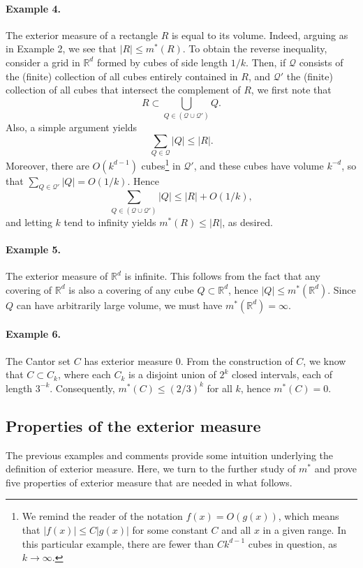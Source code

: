 \documentclass[11pt,openany]{book}
\begin{document}
\paragraph{Example 4.} The exterior measure of a rectangle $R$ is equal to its volume. Indeed, arguing as in Example 2, we see that $|R|\le m^*(R)$. To obtain the reverse inequality, consider a grid in $\mathbb{R}^d$ formed by cubes of side length $1/k$. Then, if $\mathcal Q$ consists of the (finite) collection of all cubes entirely contained in $R$, and $\mathcal Q'$ the (finite) collection of all cubes that intersect the complement of $R$, we first note that
\[
 R\subset\bigcup_{Q\in(\mathcal Q\cup\mathcal Q')}Q.
\]
Also, a simple argument yields
\[
 \sum_{Q\in\mathcal Q}|Q|\le |R|.
\]
Moreover, there are $O(k^{d-1})$ cubes\footnote{We remind the reader of the notation $f(x)=O(g(x))$, which means that $|f(x)|\le C|g(x)|$ for some constant $C$ and all $x$ in a given range. In this particular example, there are fewer than $Ck^{d-1}$ cubes in question, as $k\to\infty$.} in $\mathcal Q'$, and these cubes have volume $k^{-d}$, so that $\sum_{Q\in\mathcal Q'}|Q|=O(1/k)$. Hence
\[
 \sum_{Q\in(\mathcal Q\cup\mathcal Q')}|Q|\le |R|+O(1/k),
\]
and letting $k$ tend to infinity yields $m^*(R)\le |R|$, as desired.

\paragraph{Example 5.} The exterior measure of $\mathbb{R}^d$ is infinite. This follows from the fact that any covering of $\mathbb{R}^d$ is also a covering of any cube $Q\subset\mathbb{R}^d$, hence $|Q|\le m^*(\mathbb{R}^d)$. Since $Q$ can have arbitrarily large volume, we must have $m^*(\mathbb{R}^d)=\infty$.

\paragraph{Example 6.} The Cantor set $C$ has exterior measure $0$. From the construction of $C$, we know that $C\subset C_k$, where each $C_k$ is a disjoint union of $2^k$ closed intervals, each of length $3^{-k}$. Consequently, $m^*(C)\le(2/3)^k$ for all $k$, hence $m^*(C)=0$.

\subsection*{Properties of the exterior measure}

The previous examples and comments provide some intuition underlying the definition of exterior measure. Here, we turn to the further study of $m^*$ and prove five properties of exterior measure that are needed in what follows.
\end{document}
